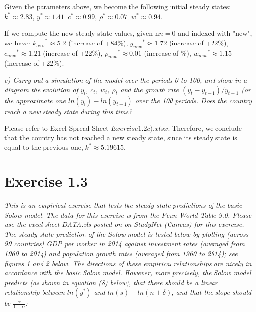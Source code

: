 \documentclass[11pt]{article} %
\begin{document}
Given the parameters above, we become the following initial steady states: $k^*\approx2.83$, $y^*\approx1.41$\, $c^*\approx0.99$, $\rho^*\approx0.07$, $w^*\approx0.94$.\par

If we compute the new steady state values, given n$n=0$ and indexed with "new", we have: ${k_{new}}^*\approx5.2$ (increase of \approx+84\%), ${y_{new}}^*\approx1.72$ (increase of \approx+22\%), ${c_{new}}^*\approx1.21$ (increase of \approx+22\%), ${\rho_{new}}^*\approx0.01$ (increase of \%), ${w_{new}}^*\approx1.15$ (increase of \approx+22\%). \par

\pagebreak

\par
\noindent \textit{c) Carry out a simulation of the model over the periods 0 to 100, and show in a diagram the evolution of $y_t$, $c_t$, $w_t$, $\rho_t$ and the growth rate $(y_t-y_{t-1})/y_{t-1}$ (or the approximate
one $ln(y_t)-ln(y_{t-1})$ over the 100 periods. Does the country reach a new steady state during this time?}\par

Please refer to Excel Spread Sheet $Exercise1.2c).xlsx$. Therefore, we conclude that the country has not reached a new steady state, since its steady state is equal to the previous one, $k^*\approx5.19615$. \par

\pagebreak

\section{Exercise 1.3}
\bigskip
\noindent \textit{This is an empirical exercise that tests the steady state predictions of the basic Solow
model. The data for this exercise is from the Penn World Table 9.0. Please use the excel
sheet DATA.xls posted on on StudyNet (Canvas) for this exercise.
The steady state prediction of the Solow model is tested below by plotting (across 99
countries) GDP per worker in 2014 against investment rates (averaged from 1960 to 2014)
and population growth rates (averaged from 1960 to 2014); see figures 1 and 2 below.
The directions of these empirical relationships are nicely in accordance with the basic
Solow model. However, more precisely, the Solow model predicts (as shown in equation
(8) below), that there should be a linear relationship between $ln(y^*)$ and $ln(s)-ln(n+\delta)$,
and that the slope should be $\frac{\alpha}{1-\alpha}$:}
\end{document}
